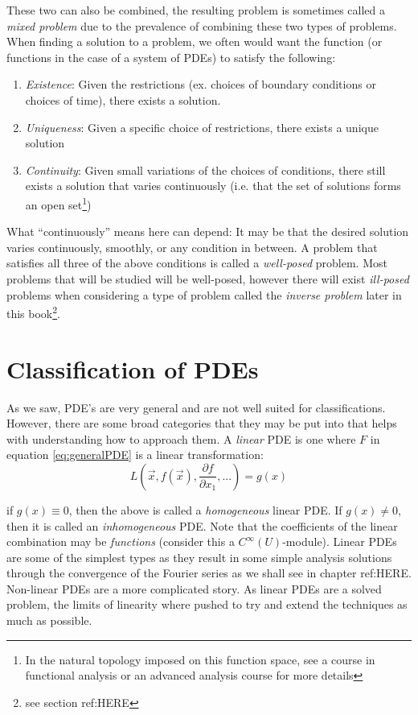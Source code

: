 \documentclass{book}
\begin{document}
These two can also be combined, the resulting problem is sometimes called a \emph{mixed problem} due to the
prevalence of combining these two types of problems. When finding a solution to a problem, we often would want
the function (or functions in the case of a system of PDEs) to satisfy the following:
\begin{enumerate}
	\item \emph{Existence}: Given the restrictions (ex. choices of boundary conditions or choices of time),
		there exists a solution.
	\item \emph{Uniqueness}: Given a specific choice of restrictions, there exists a unique solution
	\item \emph{Continuity}: Given small variations of the choices of conditions, there still exists
		a solution that varies continuously (i.e. that the set of solutions forms an open set\footnote{In the natural topology imposed
		on this function space, see a course in functional analysis or an advanced analysis course for more
	details})
\end{enumerate}

What ``continuously'' means here can depend: It may be that the desired solution varies continuously, smoothly,
or any condition in between. A problem that satisfies all three of the above conditions is called
a \emph{well-posed} problem. Most problems that will be studied will be well-posed, however there will exist
\emph{ill-posed} problems when considering a type of problem called the \emph{inverse problem} later in this
book\footnote{see section ref:HERE}.


\section*{Classification of PDEs}\label{sec:introToPDE}

As we saw, PDE's are very general and are not well suited for classifications. However, there are some broad
categories that they may be put into that helps with understanding how to approach them. A \emph{linear} PDE
is one where $F$ in equation \ref{eq:generalPDE} is a linear transformation:
\begin{equation}\label{eq:generalLinearPDE}
	L\left(\vec{x}, f(\vec{x}), \frac{\partial f}{\partial x_1}, ...\right) = g(x)
\end{equation}

if $g(x) \equiv 0$, then the above is called a \emph{homogeneous} linear PDE. If $g(x) \neq 0$, then it is
called an \emph{inhomogeneous} PDE. Note that the coefficients of the linear combination may be
\emph{functions} (consider this a $C^\infty(U)$-module). Linear PDEs are some of the simplest types as they
result in some simple analysis solutions through the convergence of the Fourier series as we shall see in
chapter ref:HERE. Non-linear PDEs are a more complicated story. As linear PDEs are a solved problem, the
limits of linearity where pushed to try and extend the techniques as much as possible.
\end{document}
